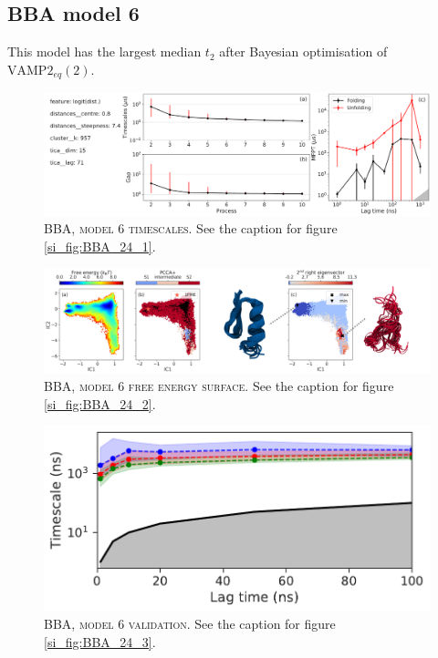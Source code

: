 \documentclass{article}
\begin{document}
\FloatBarrier
\clearpage


\subsection{BBA model 6}

This model has the largest median $t_{2}$ after Bayesian optimisation of $\mathrm{VAMP2}_{eq}(2)$.

\begin{figure}[h]
    \centering
    \includegraphics[width=\columnwidth]{SI_figures/BBA_185_SI-1.pdf}
    \caption{\textsc{BBA,  model 6 timescales}. See the caption for figure \ref{si_fig:BBA_24_1}.}
    \label{si_fig:BBA_185_1}
\end{figure}

\begin{figure}[h]
    \centering
    \includegraphics[width=\columnwidth]{SI_figures/BBA_185_SI-2.png}
    \caption{\textsc{BBA,  model 6 free energy surface}. See the caption for figure \ref{si_fig:BBA_24_2}.}
    \label{si_fig:BBA_185_2}
\end{figure}

\begin{figure}[h]
    \centering
    \includegraphics[height=0.15\textheight]{SI_figures/BBA_185_its.pdf}
    \caption{\textsc{BBA, model 6 validation}. See the caption for  figure \ref{si_fig:BBA_24_3}.}
    \label{si_fig:BBA_185_3}
\end{figure}
\end{document}

